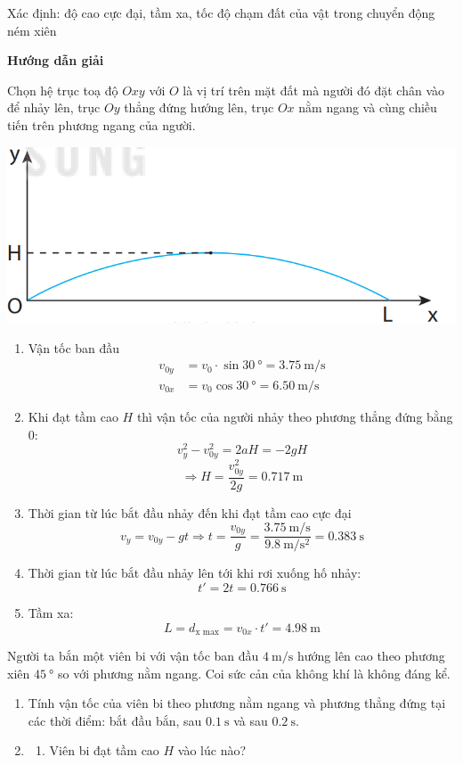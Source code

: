 \begin{dang}{Xác định: độ cao cực đại, tầm xa, tốc độ chạm đất của vật trong chuyển động ném xiên}
{}
{\begin{center}
		\textbf{Hướng dẫn giải}
	\end{center}
Chọn hệ trục toạ độ $Oxy$ với $O$ là vị trí trên mặt đất mà người đó đặt chân vào để nhảy lên, trục $Oy$ thẳng đứng hướng lên, trục $Ox$ nằm ngang và cùng chiều tiến trên phương ngang của người.
\begin{center}
	\includegraphics[width=0.4\linewidth]{../figs/VN10-2023-PH-TP013-2}
\end{center}
\begin{enumerate}[label=\alph*)]
	\item Vận tốc ban đầu
	\begin{align*}
		v_{0y}&=v_0\cdot\sin\SI{30}{\degree}=\SI{3.75}{\meter/\second}\\
		v_{0x}&=v_0\cos\SI{30}{\degree}=\SI{6.50}{\meter/\second}
	\end{align*}
\item Khi đạt tầm cao $H$ thì vận tốc của người nhảy theo phương thẳng đứng bằng $0$:
$$v^2_y-v^2_{0y}=2aH=-2gH$$
$$\Rightarrow H=\dfrac{v^2_{0y}}{2g}=\SI{0.717}{\meter}$$
\item Thời gian từ lúc bắt đầu nhảy đến khi đạt tầm cao cực đại
$$v_y=v_{0y}-gt\Rightarrow t =\dfrac{v_{0y}}{g}=\dfrac{\SI{3.75}{\meter/\second}}{\SI{9.8}{\meter/\second^2}}=\SI{0.383}{\second}$$
\item Thời gian từ lúc bắt đầu nhảy lên tới khi rơi xuống hố nhảy:
$$t'=2t=\SI{0.766}{\second}$$
\item Tầm xa:
$$L=d_\text{x max}=v_{0x}\cdot t'=\SI{4.98}{\meter}$$
\end{enumerate}
}
{Người ta bắn một viên bi với vận tốc ban đầu $\SI{4}{\meter/\second}$ hướng lên cao theo phương xiên $\SI{45}{\degree}$ so với phương nằm ngang. Coi sức cản của không khí là không đáng kể.
	\begin{enumerate}[label=\arabic*.]
		\item Tính vận tốc của viên bi theo phương nằm ngang và phương thẳng đứng tại các thời điểm: bắt đầu bắn, sau $\SI{0.1}{\second}$ và sau $\SI{0.2}{\second}$.
		\item \begin{enumerate}[label=\alph*)]
			\item Viên bi đạt tầm cao $H$ vào lúc nào?

\end{enumerate}
\end{enumerate}}
\end{dang}
